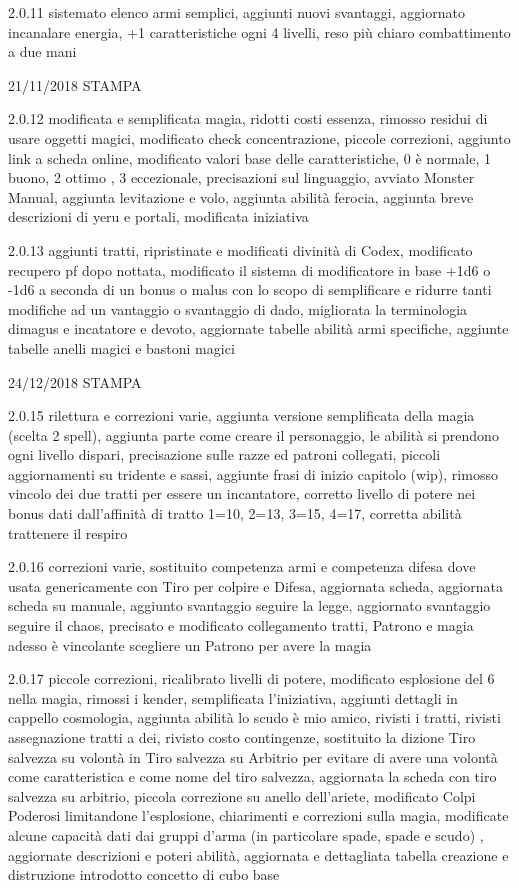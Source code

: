 \documentclass[a4paper,11pt,twoside,openany]{book}
\begin{document}
{	2.0.11 sistemato elenco armi semplici, aggiunti nuovi svantaggi, aggiornato incanalare energia, +1 caratteristiche ogni 4 livelli, reso più chiaro combattimento a due mani

	21/11/2018 STAMPA

	2.0.12 modificata e semplificata magia, ridotti costi essenza, rimosso residui di usare oggetti magici, modificato check concentrazione, piccole correzioni, aggiunto link a scheda online, modificato valori base delle caratteristiche, 0 è normale, 1 buono, 2 ottimo , 3 eccezionale, precisazioni sul linguaggio, avviato Monster Manual, aggiunta levitazione e volo, aggiunta abilità ferocia, aggiunta breve descrizioni di yeru e portali, modificata iniziativa

	2.0.13 aggiunti tratti, ripristinate e modificati divinità di Codex, modificato recupero pf dopo nottata, modificato il sistema di modificatore in base +1d6 o -1d6 a seconda di un bonus o malus con lo scopo di semplificare e ridurre tanti modifiche ad un vantaggio o svantaggio di dado, migliorata la terminologia dimagus e incatatore e devoto, aggiornate tabelle abilità armi specifiche, aggiunte tabelle anelli magici e bastoni magici

	24/12/2018 STAMPA

	2.0.15 rilettura e correzioni varie, aggiunta versione semplificata della magia (scelta 2 spell), aggiunta parte come creare il personaggio, le abilità si prendono ogni livello dispari, precisazione sulle razze ed patroni collegati, piccoli aggiornamenti su tridente e sassi, aggiunte frasi di inizio capitolo (wip), rimosso vincolo dei due tratti per essere un incantatore, corretto livello di potere nei bonus dati dall'affinità di tratto 1=10, 2=13, 3=15, 4=17, corretta abilità trattenere il respiro

	2.0.16 correzioni varie, sostituito competenza armi e competenza difesa dove usata genericamente con Tiro per colpire e Difesa, aggiornata scheda, aggiornata scheda su manuale, aggiunto svantaggio seguire la legge, aggiornato svantaggio seguire il chaos, precisato e modificato collegamento tratti, Patrono e magia adesso è vincolante scegliere un Patrono per avere la magia

	2.0.17 piccole correzioni, ricalibrato livelli di potere, modificato esplosione del 6 nella magia, rimossi i kender, semplificata l'iniziativa, aggiunti dettagli in cappello cosmologia, aggiunta abilità lo scudo è mio amico, rivisti i tratti, rivisti assegnazione tratti a dei, rivisto costo contingenze, sostituito la dizione Tiro salvezza su volontà in Tiro salvezza su Arbitrio per evitare di avere una volontà come caratteristica e come nome del tiro salvezza, aggiornata la scheda con tiro salvezza su arbitrio, piccola correzione su anello dell'ariete, modificato Colpi Poderosi limitandone l'esplosione, chiarimenti e correzioni sulla magia, modificate alcune capacità dati dai gruppi d'arma (in particolare spade, spade e scudo) , aggiornate descrizioni e poteri abilità, aggiornata e dettagliata tabella creazione e distruzione introdotto concetto di cubo base

}
\end{document}
